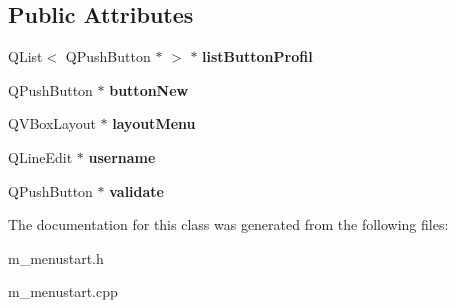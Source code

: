 \subsection*{Public Attributes}
\begin{DoxyCompactItemize}
\item 
\hypertarget{class_menu_start_a04d0eac4832176f91f62172757ce0616}{}Q\+List$<$ Q\+Push\+Button $\ast$ $>$ $\ast$ {\bfseries list\+Button\+Profil}\label{class_menu_start_a04d0eac4832176f91f62172757ce0616}

\item 
\hypertarget{class_menu_start_af01ac293a06b0da924be0ad29aa587cf}{}Q\+Push\+Button $\ast$ {\bfseries button\+New}\label{class_menu_start_af01ac293a06b0da924be0ad29aa587cf}

\item 
\hypertarget{class_menu_start_a9426199e93ab1722b19b4e4e178b0164}{}Q\+V\+Box\+Layout $\ast$ {\bfseries layout\+Menu}\label{class_menu_start_a9426199e93ab1722b19b4e4e178b0164}

\item 
\hypertarget{class_menu_start_abf21ea1841ef22859a15b1c201b8bbf6}{}Q\+Line\+Edit $\ast$ {\bfseries username}\label{class_menu_start_abf21ea1841ef22859a15b1c201b8bbf6}

\item 
\hypertarget{class_menu_start_a06ebe4101b60777e4e1465e1073d533b}{}Q\+Push\+Button $\ast$ {\bfseries validate}\label{class_menu_start_a06ebe4101b60777e4e1465e1073d533b}

\end{DoxyCompactItemize}


The documentation for this class was generated from the following files\+:\begin{DoxyCompactItemize}
\item 
m\+\_\+menustart.\+h\item 
m\+\_\+menustart.\+cpp\end{DoxyCompactItemize}
